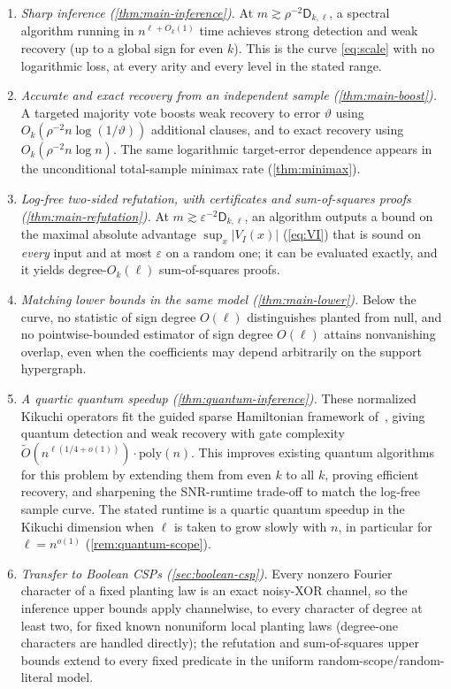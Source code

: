 \documentclass[11pt]{article}
\theoremstyle{definition}
\theoremstyle{remark}
\newcommand{\1}{\mathbf 1}
\newcommand{\eps}{\varepsilon}
\newcommand{\Dkl}{\mathsf D_{k,\ell}}
\numberwithin{equation}{section}
\begin{document}
\begin{enumerate}
\item\emph{Sharp inference (\cref{thm:main-inference}).}  At
$m\gtrsim\rho^{-2}\Dkl$, a spectral algorithm running in
$n^{\ell+O_k(1)}$ time achieves strong detection and weak recovery (up to a global sign for even $k$).  This is the curve \cref{eq:scale}
with no logarithmic loss, at every arity and every level in the stated
range.
\item\emph{Accurate and exact recovery from an independent sample
(\cref{thm:main-boost}).}  A targeted majority vote boosts weak
recovery to error $\vartheta$ using
$O_k(\rho^{-2}n\log(1/\vartheta))$ additional clauses, and to exact
recovery using $O_k(\rho^{-2}n\log n)$.  The same logarithmic
target-error dependence appears in the unconditional total-sample
minimax rate (\cref{thm:minimax}).
\item\emph{Log-free two-sided refutation, with certificates and
sum-of-squares proofs (\cref{thm:main-refutation}).}  At
$m\gtrsim\eps^{-2}\Dkl$, an algorithm outputs a bound on the maximal
absolute advantage $\sup_x|V_I(x)|$ (\cref{eq:VI}) that is sound on
\emph{every} input
and at most $\eps$ on a random one; it can be evaluated exactly, and it
yields degree-$O_k(\ell)$ sum-of-squares proofs.
\item\emph{Matching lower bounds in the same model
(\cref{thm:main-lower}).}  Below the curve, no statistic of sign degree
$O(\ell)$ distinguishes planted from null, and no pointwise-bounded
estimator of sign degree $O(\ell)$ attains nonvanishing overlap, even
when the coefficients may depend arbitrarily on the support hypergraph.

\item\emph{A quartic quantum speedup (\cref{thm:quantum-inference}).}
These normalized Kikuchi operators fit the guided sparse Hamiltonian framework
of~\cite{SOKB}, giving quantum detection and weak recovery with gate complexity $\widetilde O(n^{\ell(1/4 + o(1))}) \cdot \mathrm{poly}(n)$. This improves existing quantum algorithms for this problem by extending them from even $k$ to all $k$, proving efficient recovery, and sharpening the SNR-runtime trade-off to match the log-free sample curve. The stated runtime is a
quartic quantum speedup in the Kikuchi dimension when $\ell$ is taken to grow slowly with $n$, in particular for $\ell = n^{o(1)}$ (\cref{rem:quantum-scope}).

\item\emph{Transfer to Boolean CSPs (\cref{sec:boolean-csp}).}  Every
nonzero Fourier character of a fixed planting law is an exact noisy-XOR
channel, so the inference upper bounds apply channelwise, to every
character of degree at least two, for fixed known nonuniform local
planting laws (degree-one characters are handled directly); the
refutation and sum-of-squares upper bounds extend to every fixed
predicate in the uniform random-scope/random-literal model.
\end{enumerate}
\end{document}
